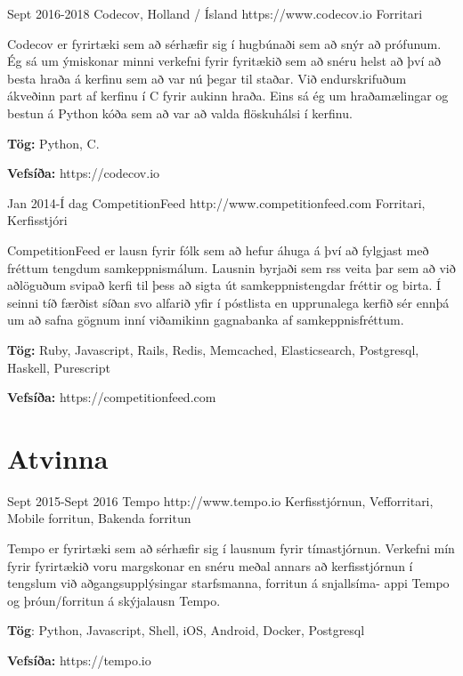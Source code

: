 \documentclass[10pt]{article} %
\begin{document}
\job
{Sept 2016-}{2018}
{Codecov, Holland / Ísland}
{https://www.codecov.io}
{Forritari}
{Codecov er fyrirtæki sem að sérhæfir sig í hugbúnaði sem að snýr að prófunum. Ég sá um ýmiskonar minni verkefni fyrir fyritækið sem að snéru helst að því að besta hraða á kerfinu sem að var nú þegar til staðar. Við endurskrifuðum ákveðinn part af kerfinu í C fyrir aukinn hraða. Eins sá ég um hraðamælingar og bestun á Python kóða sem að var að valda flöskuhálsi í kerfinu. \\
\rule{0mm}{5mm}\textbf{Tög:} Python, C.\\
\rule{0mm}{5mm}\textbf{Vefsíða:} https://codecov.io 
}

\job
{Jan 2014-}{Í dag}
{CompetitionFeed}
{http://www.competitionfeed.com}
{Forritari, Kerfisstjóri}
{CompetitionFeed er lausn fyrir fólk sem að hefur áhuga á því að fylgjast með fréttum tengdum samkeppnismálum. Lausnin byrjaði sem rss veita þar sem að við aðlöguðum svipað kerfi til þess að sigta út samkeppnistengdar fréttir og birta. Í seinni tíð færðist síðan svo alfarið yfir í póstlista en upprunalega kerfið sér ennþá um að safna gögnum inní viðamikinn gagnabanka af samkeppnisfréttum.\\
\rule{0mm}{5mm}\textbf{Tög:} Ruby, Javascript, Rails, Redis, Memcached, Elasticsearch, Postgresql, Haskell, Purescript\\
\rule{0mm}{5mm}\textbf{Vefsíða:} https://competitionfeed.com
}


\newpage

\section{Atvinna}

\job
{Sept 2015-}{Sept 2016}
{Tempo}
{http://www.tempo.io}
{Kerfisstjórnun, Vefforritari, Mobile forritun, Bakenda forritun}
{Tempo er fyrirtæki sem að sérhæfir sig í lausnum fyrir tímastjórnun. Verkefni mín fyrir fyrirtækið voru margskonar en snéru meðal annars að kerfisstjórnun í tengslum við aðgangsupplýsingar starfsmanna, forritun á snjallsíma- appi Tempo og þróun/forritun á skýjalausn Tempo.\\
\rule{0mm}{5mm}\textbf{Tög}: Python, Javascript, Shell, iOS, Android, Docker, Postgresql\\
\rule{0mm}{5mm}\textbf{Vefsíða:} https://tempo.io
}
\end{document}

